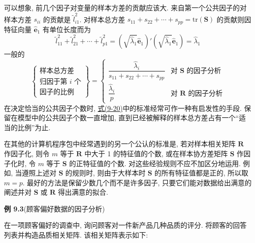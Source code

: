 可以想象, 前几个因子对变量的样本方差的贡献应该大. 来自第一个公共因子的对样本方差 $s_{ii}$ 的贡献是 $\tilde{l}_{i1}^2$. 对样本总方差 $s_{11}+s_{22}+\cdots+s_{pp}=\mathrm{tr}(\mathbf{S})$ 的贡献则因特征向量 $\hat{\mathbf{e}}_1$ 有单位长度而为
\[
\tilde{l}_{11}^2+\tilde{l}_{21}^2+\cdots+\tilde{l}_{p1}^2=(\sqrt{\hat{\lambda}_1}\hat{\mathbf{e}}_1)'(\sqrt{\hat{\lambda}_1}\hat{\mathbf{e}}_1)=\hat{\lambda}_1
\]
一般的
\label{eq:9-20}
\begin{equation}
\left\{\begin{array}{c}
\text{样本总方差}\\
\text{归因于第 } i \text{ 个}\\
\text{因子的比例}
\end{array}\right\}
=\begin{cases}
\dfrac{\hat{\lambda}_i}{s_{11}+s_{22}+\cdots+s_{pp}} & \text{对 } \mathbf{S} \text{ 的因子分析}\\[12pt]
\dfrac{\hat{\lambda}_i}{p} & \text{对 } \mathbf{R} \text{ 的因子分析}
\end{cases}
\tag{9-20}
\end{equation}
在决定恰当的公共因子个数时, \hyperref[eq:9-20]{式(9-20)}中的标准经常可作一种有启发性的手段. 保留在模型中的公共因子个数一直增加, 直到已经被解释的样本总方差占有一个“适当的比例”为止.

在其他的计算机程序包中经常遇到的另一个公认的标准是, 若对样本相关矩阵 $\mathbf{R}$ 作因子化, 则令 $m$ 等于 $\mathbf{R}$ 中大于 1 的特征值的个数, 或在样本协方差矩阵 $\mathbf{S}$ 作因子化时, 令 $m$ 等于 $\mathbf{S}$ 的正特征值的个数. 对这些经验规则不应不加区分地运用. 例如, 当遵照上述对 $\mathbf{S}$ 的规则时, 则由于大样本时 $\mathbf{S}$ 的所有特征值都是正的, 所以取 $m=p$. 最好的方法是保留少数几个而不是许多因子, 只要它们能对数据给出满意的阐述并对 $\mathbf{S}$ 或 $\mathbf{R}$ 得出满意的拟合.

\noindent\textbf{例 9.3}\quad (顾客偏好数据的因子分析)

在一项顾客偏好的调查中, 询问顾客对一件新产品几种品质的评分. 将顾客的回答列表并构造品质相关矩阵. 该相关矩阵表示如下:

